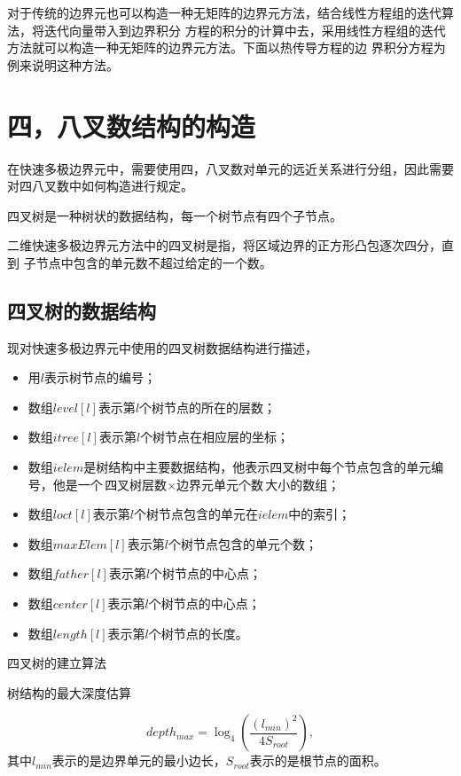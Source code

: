 对于传统的边界元也可以构造一种无矩阵的边界元方法，结合线性方程组的迭代算法，将迭代向量带入到边界积分
方程的积分的计算中去，采用线性方程组的迭代方法就可以构造一种无矩阵的边界元方法。下面以热传导方程的边
界积分方程为例来说明这种方法。

\section{四，八叉数结构的构造}

在快速多极边界元中，需要使用四，八叉数对单元的远近关系进行分组，因此需要对四八叉数中如何构造进行规定。

\begin{definition}
四叉树是一种树状的数据结构，每一个树节点有四个子节点。	
\end{definition}

二维快速多极边界元方法中的四叉树是指，将区域边界的正方形凸包逐次四分，直到
子节点中包含的单元数不超过给定的一个数。

\subsection{四叉树的数据结构}

现对快速多极边界元中使用的四叉树数据结构进行描述，
\begin{itemize}
	\item 用$l$表示树节点的编号；
	\item 数组$level[l]$表示第$l$个树节点的所在的层数；
	\item 数组$itree[l]$表示第$l$个树节点在相应层的坐标；
	\item 数组$ielem$是树结构中主要数据结构，他表示四叉树中每个节点包含的单元编号，他是一个$\textit{四叉树层数} \times \textit{边界元单元个数}$大小的数组；
	\item 数组$loct[l]$表示第$l$个树节点包含的单元在$ielem$中的索引；
	\item 数组$maxElem[l]$表示第$l$个树节点包含的单元个数；
	\item 数组$father[l]$表示第$l$个树节点的中心点；
	\item 数组$center[l]$表示第$l$个树节点的中心点；
	\item 数组$length[l]$表示第$l$个树节点的长度。 
\end{itemize}

四叉树的建立算法

树结构的最大深度估算

\begin{equation}
	depth_{max} = \log_4(\frac{(l_{min})^2}{4S_{root}}),
\end{equation}
其中$l_{min}$表示的是边界单元的最小边长，$S_{root}$表示的是根节点的面积。


